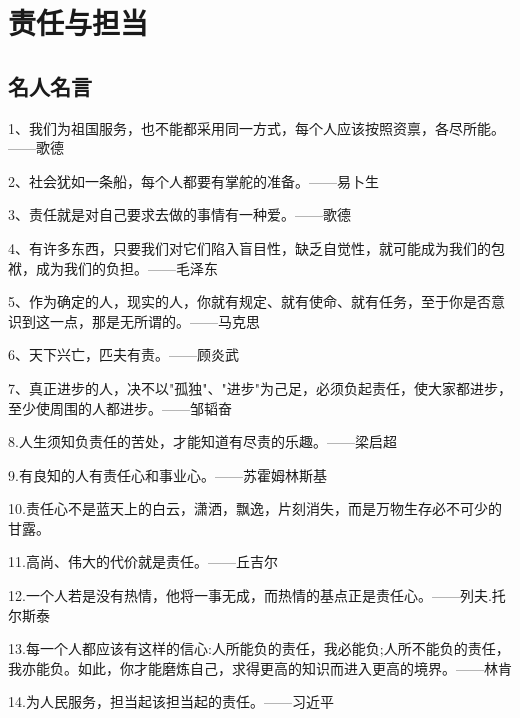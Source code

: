 \documentclass[UTF8]{ctexart}
\begin{document}
\section{责任与担当}
\subsection{名人名言}
1、我们为祖国服务，也不能都采用同一方式，每个人应该按照资禀，各尽所能。——歌德\par
2、社会犹如一条船，每个人都要有掌舵的准备。——易卜生\par
3、责任就是对自己要求去做的事情有一种爱。——歌德\par
4、有许多东西，只要我们对它们陷入盲⽬性，缺乏⾃觉性，就可能成为我们的包袱，成为我们的负担。——⽑泽东\par
5、作为确定的人，现实的人，你就有规定、就有使命、就有任务，至于你是否意识到这⼀点，那是无所谓的。——马克思\par
6、天下兴亡，匹夫有责。——顾炎武\par
7、真正进步的人，决不以"孤独"、"进步"为⼰⾜，必须负起责任，使⼤家都进步，至少使周围的人都进步。——邹韬奋\par
8.人生须知负责任的苦处，才能知道有尽责的乐趣。——梁启超\par
9.有良知的人有责任心和事业心。——苏霍姆林斯基\par
10.责任心不是蓝天上的白云，潇洒，飘逸，片刻消失，而是万物生存必不可少的甘露。\par
11.高尚、伟大的代价就是责任。——丘吉尔\par
12.一个人若是没有热情，他将一事无成，而热情的基点正是责任心。——列夫.托尔斯泰\par
13.每一个人都应该有这样的信心:人所能负的责任，我必能负;人所不能负的责任，我亦能负。如此，你才能磨炼自己，求得更高的知识而进入更高的境界。——林肯\par
14.为人民服务，担当起该担当起的责任。——习近平\par
\end{document}
